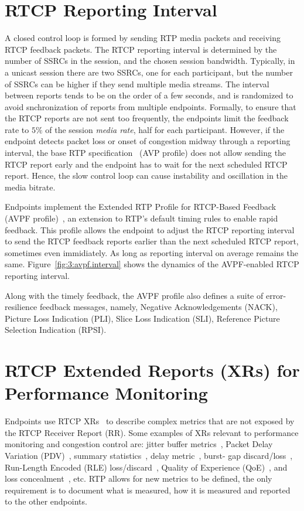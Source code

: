 \section{RTCP Reporting Interval}

A closed control loop is formed by sending RTP media packets and receiving
RTCP feedback packets. The RTCP reporting interval is determined by the number
of SSRCs in the session, and the chosen session bandwidth. Typically, in a
unicast session there are two SSRCs, one for each participant, but the number
of SSRCs can be higher if they send multiple media streams. The interval
between reports tends to be on the order of a few seconds, and is randomized
to avoid snchronization of reports from multiple endpoints. Formally, to
ensure that the RTCP reports are not sent too frequently, the endpoints limit
the feedback rate to $5\%$ of the session \textit{media rate}, half for each
participant. However, if the endpoint detects packet loss or onset of
congestion midway through a reporting interval, the base RTP
specification~\cite{rfc3550} (AVP profile) does not allow sending the RTCP
report early and the endpoint has to wait for the next scheduled RTCP report.
Hence, the slow control loop can cause instability and oscillation in the
media bitrate.


Endpoints implement the Extended RTP Profile for RTCP-Based Feedback (AVPF
profile)~\cite{rfc4585}, an extension to RTP's default timing rules to enable
rapid feedback. This profile allows the endpoint to adjust the RTCP reporting
interval to send the RTCP feedback reports earlier than the next scheduled
RTCP report, sometimes even immidiately. As long as reporting interval on
average remains the same. Figure~\ref{fig:3:avpf.interval} shows the dynamics
of the AVPF-enabled RTCP reporting interval.

Along with the timely feedback, the AVPF profile also defines a suite of
error-resilience feedback messages, namely, Negative Acknowledgements (NACK),
Picture Loss Indication (PLI), Slice Loss Indication (SLI), Reference Picture
Selection Indication (RPSI).

\section{RTCP Extended Reports (XRs) for Performance Monitoring}

Endpoints use RTCP XRs~\cite{rfc3611} to describe complex metrics that are not
exposed by the RTCP Receiver Report (RR). Some examples of XRs relevant to
performance monitoring and congestion control are: jitter buffer
metrics~\cite{draft.xr.jb}, Packet Delay Variation (PDV)~\cite{rfc6798},
summary statistics~\cite{draft.xr.stat}, delay metric~\cite{rfc6843}, burst-
gap discard/loss~\cite{draft.xr.bg.loss, draft.xr.bg.discard}, Run-Length
Encoded (RLE) loss/discard~\cite{draft.xr.discard.rle}, Quality of Experience
(QoE)~\cite{draft.xr.qoe}, and loss concealment~\cite{draft.xr.conceal}, etc.
RTP allows for new metrics to be defined, the only requirement is to document
what is measured, how it is measured and reported to the other endpoints.


